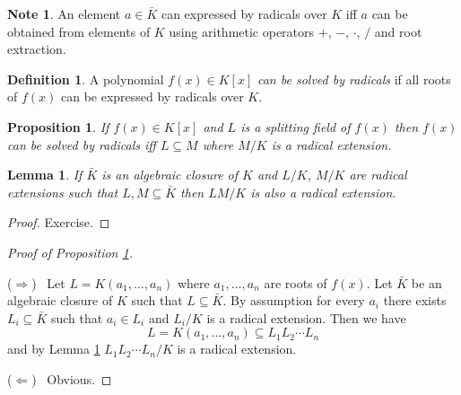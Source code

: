 \documentclass[12pt, letterpaper, oneside]{article}
\theoremstyle{plain}
\newtheorem{lemma}[theorem]{Lemma}
\newtheorem{proposition}[theorem]{Proposition}
\theoremstyle{definition}
\newtheorem{definition}[theorem]{Definition}
\newtheorem{note}[theorem]{Note}
\newcommand{\vs}{\vskip 5mm}
\begin{document}
\vs\vs


\begin{note}
An element $a\in \bar{K}$ can expressed by radicals over $K$ iff $a$ can be obtained 
from elements of $K$ using arithmetic operators $+$, $-$, $\cdot$, $/$ and root extraction.  
\end{note}


\vs\vs



\begin{definition}
A polynomial $f(x)\in K[x]$ \emph{can be solved by radicals}  if all roots of $f(x)$
can be expressed by radicals over $K$. 
\end{definition}


\vs\vs



\begin{proposition}
\label{PROP_RADICALSPLITFIELD}
If $f(x)\in K[x]$ and $L$ is a splitting field of $f(x)$ then $f(x)$ can be solved by radicals 
iff $L\subseteq M$ where $M/K$ is a radical extension. 
\end{proposition}



\vs\vs


\begin{lemma}
\label{LEMMA_MNRADEXT}
If $\bar{K}$ is an algebraic closure of $K$ and $L/K$, $M/K$ are radical extensions 
such that $L, M\subseteq \bar{K}$ then $LM/K$ is also a radical extension.  
\end{lemma}


\vs

\begin{proof}
Exercise. 
\end{proof}


\vs\vs

\begin{proof}[Proof of Proposition \ref{PROP_RADICALSPLITFIELD}] \ 

($\Rightarrow$) \ Let $L= K(a_{1}, \dots, a_{n})$ where $a_{1}, \dots, a_{n}$ are roots of $f(x)$. 
Let $\bar{K}$ be an algebraic closure of $K$ such that $L\subseteq \bar{K}$. 
By assumption for every $a_{i}$ there exists $L_{i}\subseteq \bar{K}$ such that $a_{i}\in L_{i}$
and $L_{i}/K$ is a radical extension. Then we have 
$$L = K(a_{1}, \dots, a_{n})\subseteq L_{1}L_{2}\cdots L_{n}$$
and by Lemma \ref{LEMMA_MNRADEXT}  $L_{1}L_{2}\cdots L_{n}/K$ is a radical extension. 

\vs 

($\Leftarrow$) \ Obvious. 

\end{proof}
\end{document}
